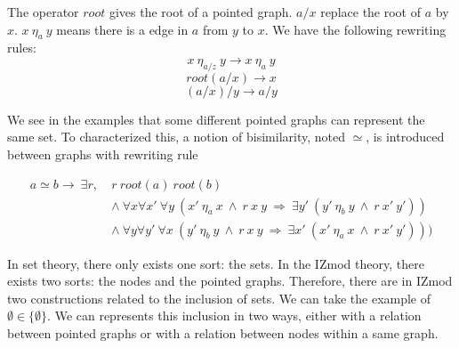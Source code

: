 \documentclass[submission,copyright,creativecommons]{eptcs}
\def\lra{\longrightarrow}
\def\imp{\mathbin{\Rightarrow}}
\def\fa{{\forall}}
\def\conj{\mathbin{\wedge}}
\def\ex{{\exists}}
\begin{document}
The operator $root$ gives the root of a pointed graph. $a/x$ replace the root of $a$ by $x$. $x~\eta_a~y$ means there is a edge in $a$ from $y$ to $x$. We have the following rewriting rules:
$$ x \ \eta_{a/z} \ y \longrightarrow x \ \eta_a \ y $$
$$ root(a/x) \longrightarrow x $$
$$ (a/x)/y \longrightarrow a/y $$

We see in the examples that some different pointed graphs can represent the same set. To characterized this, a notion of  bisimilarity, noted $\simeq$, is introduced between graphs with rewriting rule 

\begin{equation*}
\begin{split}
a \simeq b \lra~\ex r,~ &r~root(a)~root(b) \\
&\conj \ \fa x \fa x'~\fa y~(x'~\eta_a~x~\conj~r~x~y~\imp~\ex y'~(y'~\eta_b~y~\conj~r~x'~y')) \\
&\conj \ \fa y \fa y'~\fa x~(y'~\eta_b~y~\conj~r~x~y~\imp~\ex x'~(x'~\eta_a~x~\conj~r~x'~y')))
\end{split}
\end{equation*}

\begin{figure}[h]
\centering
{}
\end{figure}

In set theory, there only exists one sort: the sets. In the IZmod theory, there exists two sorts: the nodes and the pointed graphs. Therefore, there are in IZmod two constructions related to the inclusion of sets. We can take the example of $\emptyset \in \{\emptyset\}$. We can represents this inclusion in two ways, either with a relation between pointed graphs or with a relation between nodes within a same graph.

\begin{figure}[h]
\centering
{}
\end{figure}
\end{document}
